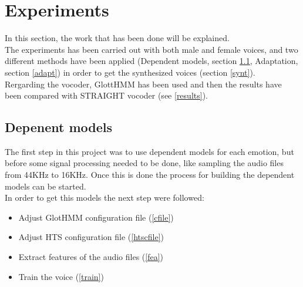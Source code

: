 \section{Experiments}\label{experiments}
In this section, the work that has been done will be explained. \\
The experiments has been carried out with both male and female voices, and two different methods have been applied (Dependent models, section \ref{dpm}, Adaptation, section \ref{adapt}) in order to get the synthesized voices (section \ref{synt}).\\
Rergarding the vocoder, GlottHMM has been used and then the results have been compared with STRAIGHT vocoder (see \ref{results}).\\
\subsection{Depenent models}\label{dpm}
The first step in this project was to use dependent models for each emotion, but before some signal processing needed to be done, like sampling the audio files from 44KHz to 16KHz. Once this is done the process for building the dependent models can be started.\\
In order to get this models the next step were followed:
\begin{itemize}
	\item Adjust GlotHMM configuration file (\ref{cfile})
	\item Adjust HTS configuration file (\ref{htscfile})
	\item Extract features of the audio files (\ref{fea})
	\item Train the voice (\ref{train})
\end{itemize} 
